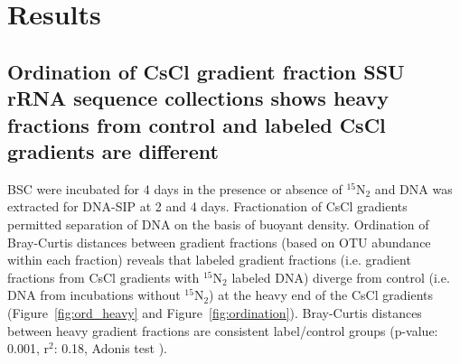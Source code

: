 \section{Results}
\subsection{Ordination of CsCl gradient fraction SSU rRNA sequence collections
shows heavy fractions from control and labeled CsCl gradients are
different} 
BSC were incubated for 4 days in the presence or absence of $^{15}$N$_{2}$ and
DNA was extracted for DNA-SIP at 2 and 4 days. Fractionation of CsCl gradients
permitted separation of DNA on the basis of buoyant density. Ordination of
Bray-Curtis distances \citep{Bray_1957} between gradient fractions (based on OTU
abundance within each fraction) reveals that labeled gradient fractions (i.e.
gradient fractions from CsCl gradients with $^{15}$N$_{2}$ labeled DNA) diverge
from control (i.e. DNA from incubations without $^{15}$N$_{2}$) at the
heavy end of the CsCl gradients (Figure~\ref{fig:ord_heavy} and
Figure~\ref{fig:ordination}). Bray-Curtis distances between heavy gradient
fractions are consistent label/control groups (p-value: 0.001, r$^{2}$: 0.18, 
Adonis test \citep{Anderson_2001}). 

